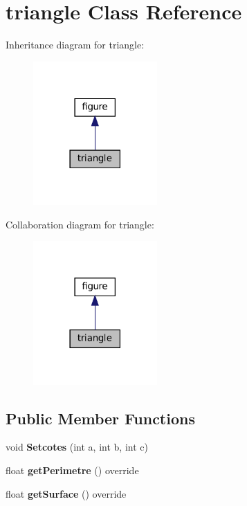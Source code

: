 \hypertarget{classtriangle}{}\section{triangle Class Reference}
\label{classtriangle}


Inheritance diagram for triangle\+:
\nopagebreak
\begin{figure}[H]
\begin{center}
\leavevmode
\includegraphics[width=134pt]{classtriangle__inherit__graph}
\end{center}
\end{figure}


Collaboration diagram for triangle\+:
\nopagebreak
\begin{figure}[H]
\begin{center}
\leavevmode
\includegraphics[width=134pt]{classtriangle__coll__graph}
\end{center}
\end{figure}
\subsection*{Public Member Functions}
\begin{DoxyCompactItemize}
\item 
\mbox{\label{classtriangle_a972fd35b7e835e551bc70cb41e17b509}} 
void {\bfseries Setcotes} (int a, int b, int c)
\item 
\mbox{\label{classtriangle_ac768fd572b720d004150e6c71bf2071c}} 
float {\bfseries get\+Perimetre} () override
\item 
\mbox{\label{classtriangle_a3726b59fd5c556403471d1813632b09a}} 
float {\bfseries get\+Surface} () override
\end{DoxyCompactItemize}
